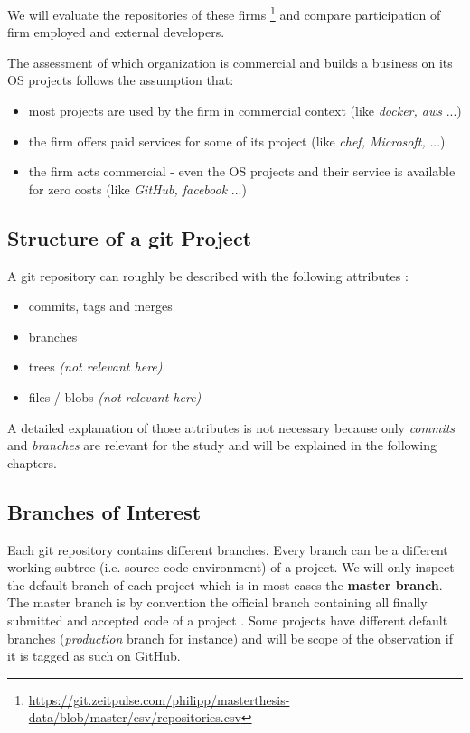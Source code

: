 We will evaluate the repositories of these firms \footnote{\url{https://git.zeitpulse.com/philipp/masterthesis-data/blob/master/csv/repositories.csv}} and compare participation of firm employed and external developers.

The assessment of which organization is commercial and builds a business on its OS projects follows the assumption that:

\begin{itemize}%
	\item most projects are used by the firm in commercial context (like \textit{docker, aws} ...)
	\item the firm offers paid services for some of its project (like \textit{chef, Microsoft, } ...)
	\item the firm acts commercial - even the OS projects and their service is available for zero costs (like \textit{GitHub, facebook} ...)
\end{itemize}

\subsection{Structure of a git Project}

A git repository can roughly be described with the following attributes \cite[p.~32]{loeliger2012version}:

\begin{itemize}
	\item commits, tags and merges
	\item branches
	\item trees \textit{(not relevant here)}
	\item files / blobs \textit{(not relevant here)}
\end{itemize}

A detailed explanation of those attributes is not necessary because only \textit{commits} and \textit{branches} are relevant for the study and will be explained in the following chapters.

\subsection{Branches of Interest}

Each git repository contains different branches. Every branch can be a different working subtree (i.e. source code environment) of a project. We will only inspect the default branch of each project which is in most cases the \textbf{master branch}. The master branch is by convention the official branch containing all finally submitted and accepted code of a project \cite[p.~89-90]{loeliger2012version}. Some projects have different default branches (\textit{production} branch for instance) and will be scope of the observation if it is tagged as such on GitHub.

